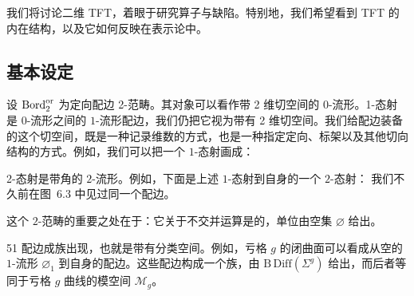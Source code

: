我们将讨论二维 TFT，着眼于研究算子与缺陷。特别地，我们希望看到 TFT 的内在结构，以及它如何反映在表示论中。

\subsection{基本设定}\label{sec:10-4-1}

设 $\mathrm{Bord}_2^{\mathrm{or}}$ 为定向配边 2-范畴。其对象可以看作带 2 维切空间的 $0$-流形。1-态射是 $0$-流形之间的 $1$-流形配边，我们仍把它视为带有 2 维切空间。我们给配边装备的这个切空间，既是一种记录维数的方式，也是一种指定定向、标架以及其他切向结构的方式。例如，我们可以把一个 $1$-态射画成：

2-态射是带角的 $2$-流形。例如，下面是上述 $1$-态射到自身的一个 $2$-态射：
我们不久前在图~6.3 中见过同一个配边。

这个 $2$-范畴的重要之处在于：它关于不交并运算是的，单位由空集 $\varnothing$ 给出。

\begin{srcrem}{51}
配边成族出现，也就是带有分类空间。例如，亏格 $g$ 的闭曲面可以看成从空的 $1$-流形 $\varnothing_1$ 到自身的配边。这些配边构成一个族，由 $\mathrm{B}\,\mathrm{Diff}(\Sigma^{g})$ 给出，而后者等同于亏格 $g$ 曲线的模空间 $\mathcal{M}_g$。
\end{srcrem}

